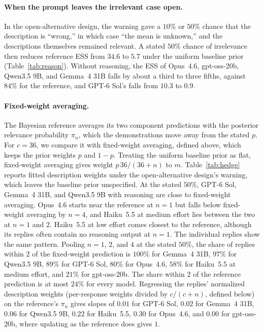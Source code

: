 \documentclass{article}
\theoremstyle{definition}
\begin{document}
\paragraph{When the prompt leaves the irrelevant case open.}
In the open-alternative design, the warning gave a $10\%$ or $50\%$ chance that the description is ``wrong,'' in which case ``the mean is unknown,'' and the descriptions themselves remained relevant. A stated $50\%$ chance of irrelevance then reduces reference ESS from $34.6$ to $5.7$ under the uniform baseline prior (Table~\ref{tab:reason}). Without reasoning, the ESS of Opus~4.6, gpt-oss-20b, Qwen3.5 9B, and Gemma~4 31B falls by about a third to three fifths, against $84\%$ for the reference, and GPT-6 Sol's falls from $10.3$ to $0.9$.

\paragraph{Fixed-weight averaging.}
The Bayesian reference averages its two component predictions with the posterior relevance probability $\pi_n$, which the demonstrations move away from the stated $p$. For $c=36$, we compare it with fixed-weight averaging, defined above, which keeps the prior weights $p$ and $1-p$. Treating the uniform baseline prior as flat, fixed-weight averaging gives weight $p\,36/(36+n)$ to $m$. Table~\ref{tab:hedge} reports fitted description weights under the open-alternative design's warning, which leaves the baseline prior unspecified. At the stated $50\%$, GPT-6 Sol, Gemma~4 31B, and Qwen3.5 9B with reasoning are close to fixed-weight averaging. Opus~4.6 starts near the reference at $n=1$ but falls below fixed-weight averaging by $n=4$, and Haiku~5.5 at medium effort lies between the two at $n=1$ and $2$. Haiku~5.5 at low effort comes closest to the reference, although its replies often contain no reasoning output at $n=1$. The individual replies show the same pattern. Pooling $n=1$, $2$, and $4$ at the stated $50\%$, the share of replies within $2$ of the fixed-weight prediction is $100\%$ for Gemma~4 31B, $97\%$ for Qwen3.5 9B, $89\%$ for GPT-6 Sol, $80\%$ for Opus~4.6, $58\%$ for Haiku~5.5 at medium effort, and $21\%$ for gpt-oss-20b. The share within $2$ of the reference prediction is at most $24\%$ for every model. Regressing the replies' normalized description weights (per-response weights divided by $c/(c+n)$, defined below) on the reference's $\pi_n$ gives slopes of $0.01$ for GPT-6 Sol, $0.02$ for Gemma~4 31B, $0.06$ for Qwen3.5 9B, $0.22$ for Haiku~5.5, $0.30$ for Opus~4.6, and $0.00$ for gpt-oss-20b, where updating as the reference does gives $1$.
\end{document}
